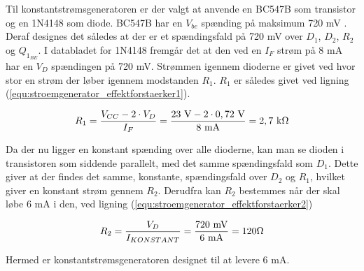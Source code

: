 Til konstantstrømsgeneratoren er der valgt at anvende en BC547B som transistor og en 1N4148 som diode. BC547B har en $V_{be}$ spænding på maksimum 720 mV . Deraf designes det således at der er et spændingsfald på 720 mV over $D_1$, $D_2$, $R_{2}$ og $Q_{1_{BE}}$. I databladet for 1N4148 fremgår det at den  ved en $I_F$ strøm på 8 mA har en $V_D$ spændingen på 720 mV. Strømmen igennem dioderne er givet ved hvor stor en strøm der løber igennem modstanden $R_{1}$. $R_{1}$ er således givet ved ligning (\ref{equ:stroemgenerator_effektforstaerker1}).

\begin{equation}
\label{equ:stroemgenerator_effektforstaerker1}
R_{1} = \frac{V_{CC} - 2 \cdot V_D}{I_F} = \mathrm{\frac{23~V - 2 \cdot 0,72~V}{8~mA} = 2,7~k\ohm}
\end{equation}

Da der nu ligger en konstant spænding over alle dioderne, kan man se dioden i transistoren som siddende parallelt, med det samme spændingsfald som $D_1$. Dette giver at der findes det samme, konstante, spændingsfald over $D_2$ og $R_{1}$, hvilket giver en konstant strøm gennem $R_{2}$. Derudfra kan $R_{2}$ bestemmes når der skal løbe 6 mA i den, ved ligning (\ref{equ:stroemgenerator_effektforstaerker2})

\begin{equation}
\label{equ:stroemgenerator_effektforstaerker2}
R_{2} = \frac{V_{D}}{I_{KONSTANT}} = \mathrm{\frac{720~mV}{6~mA} = 120\ohm}
\end{equation}

Hermed er konstantstrømsgeneratoren designet til at levere 6 mA.
